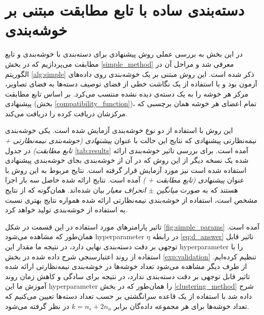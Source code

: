 \section{دسته‌بندی ساده با تابع مطابقت مبتنی بر خوشه‌بندی} \label{exp:simple}
در این بخش به بررسی عملی روش پیشنهادی برای دسته‌بندی با خوشه‌بندی و تابع مطابقت می‌پردازیم که  در بخش \ref{simple_method} معرفی شد و مراحل آن در الگوریتم \ref{alg:simple} ذکر شده است. این روش مبتنی بر یک خوشه‌بندی روی داده‌های آزمون بود و با استفاده از یک نگاشت خطی از فضای توصیف دسته‌ها به فضای تصاویر، مرکز هر خوشه را به یک دسته‌ی دیده نشده منتسب می‌کرد. بر اساس تابع مطابقت پیشنهادی (بخش \ref{compatibility_function})، تمام اعضای هر خوشه همان برچسبی که مرکزشان دریافت کرده را دریافت می‌کند.

این روش با استفاده از دو نوع خوشه‌بندی آزمایش شده است. یکی خوشه‌بندی نیمه‌نظارتی پیشنهادی که نتایج این حالت با عنوان
\textit{پیشنهادی (خوشه‌بندی نیمه‌نظارتی + تابع مطابقت) }
در جدول \ref{tab:results} آمده است.
 برای بررسی تاثیر خوشه‌بندی ارائه شده یک نسخه دیگر از این روش که در آن از خوشه‌بندی  بجای خوشه‌بندی پیشنهادی استفاده شده است نیز مورد آزمایش قرار گرفته است. نتایج مربوط به این روش با عنوان
\textit{ پیشنهادی (تابع مطابقت +  ) }
آمده است. نتایج ارائه شده حاصل سه بار اجرا هستند که به صورت
\textit{ میانگین $\pm$ انحراف معیار }
بیان شده‌اند. همان‌گونه که از نتایج مشخص است، استفاده از خوشه‌بندی نیمه‌نظارتی ارائه شده همواره نتایج بهتری نسبت به استفاده از خوشه‌بندی   تولید خواهد کرد.

 تاثیر پارامترهای مورد استفاده در این قسمت در شکل \ref{fig:simple_params} آمده است. همان‌طور که مشاهده می‌شود \gls{hyperparameter} $\eta$ در رابطه
 \eqref{eq:d_answer}
تاثیر قابل توجهی بر دقت دسته‌بندی نهایی دارد، در نتیجه ما مقدار این \gls{hyperparameter} را با استفاده از روند اعتبارسنجی شرح داده شده در بخش \ref{exp:validation} تنظیم کرده‌ایم. از طرف دیگر مشاهده می‌شود تعداد خوشه‌ها در خوشه‌بندی نیمه‌نظارتی ارائه شده تاثیر قابل توجهی بر دقت دسته‌بندی ندارد، در نتیجه برای سادگی و کاهش زمان روند آموزش ما این \gls{hyperparameter} را همان‌طور که در بخش
 \ref{clustering_method}
 شرح داده شد با استفاده از یک قاعده سرانگشتی بر حسب تعداد دسته‌ها تعیین می‌کنیم که تعداد خوشه‌ها برای هر مجموعه داد‌ه‌گان برابر $k = n_s + 2n_u$ در نظر گرفته می‌شود.

